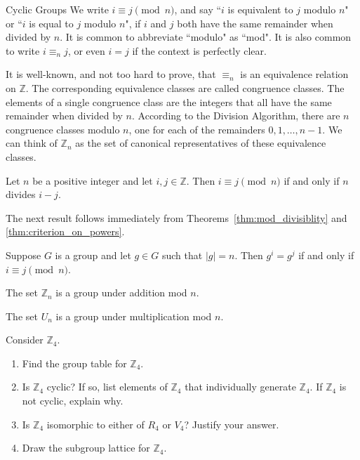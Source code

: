 \begin{section}{Cyclic Groups}
We write $i\equiv j\pmod n$, and say ``$i$ is equivalent to $j$ modulo $n$" or ``$i$ is equal to $j$ modulo $n$", if $i$ and $j$ both have the same remainder when divided by $n$.  It is common to abbreviate ``modulo" as ``mod".  It is also common to write $i\equiv_n j$, or even $i=j$ if the context is perfectly clear.  

It is well-known, and not too hard to prove, that $\equiv_n$ is an equivalence relation on $\mathbb{Z}$.  The corresponding equivalence classes are called congruence classes.  The elements of a single congruence class are the integers that all have the same remainder when divided by $n$. According to the Division Algorithm, there are $n$ congruence classes modulo $n$, one for each of the remainders $0,1,\ldots, n-1$. We can think of $\mathbb{Z}_n$ as the set of canonical representatives of these equivalence classes.

\begin{theorem}\label{thm:mod_divisiblity}
Let $n$ be a positive integer and let $i,j\in\mathbb{Z}$. Then $i\equiv j\pmod n$ if and only if $n$ divides $i-j$.
\end{theorem}

The next result follows immediately from Theorems~\ref{thm:mod_divisiblity} and \ref{thm:criterion_on_powers}.

\begin{corollary}
Suppose $G$ is a group and let $g\in G$ such that $|g|=n$.  Then $g^i=g^j$ if and only if $i\equiv j\pmod n$.
\end{corollary}

\begin{theorem}
The set $\mathbb{Z}_n$ is a group under addition mod $n$.  
\end{theorem}

\begin{theorem}
The set $U_n$ is a group under multiplication mod $n$.  
\end{theorem}

\begin{problem}
Consider $\mathbb{Z}_4$.
\begin{enumerate}[label=\rm{(\alph*)}]
\item Find the group table for $\mathbb{Z}_4$.
\item Is $\mathbb{Z}_4$ cyclic? If so, list elements of $\mathbb{Z}_4$ that individually generate $\mathbb{Z}_4$.  If $\mathbb{Z}_4$ is not cyclic, explain why.
\item Is $\mathbb{Z}_4$ isomorphic to either of $R_4$ or $V_4$? Justify your answer.
\item Draw the subgroup lattice for $\mathbb{Z}_4$.
\end{enumerate}
\end{problem}


\end{section}
